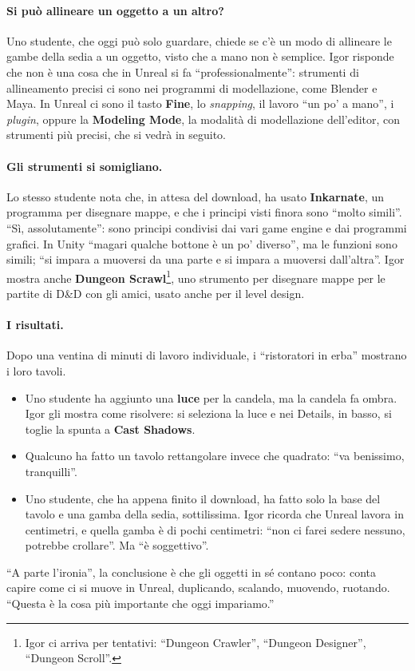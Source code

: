 \paragraph{Si può allineare un oggetto a un altro?} Uno studente, che oggi può solo
guardare, chiede se c'è un modo di allineare le gambe della sedia a un oggetto, visto
che a mano non è semplice. Igor risponde che non è una cosa che in Unreal si fa
``professionalmente'': strumenti di allineamento precisi ci sono nei programmi di
modellazione, come Blender e Maya. In Unreal ci sono il tasto \textbf{Fine}, lo
\emph{snapping}, il lavoro ``un po' a mano'', i \emph{plugin}, oppure la
\textbf{Modeling Mode}, la modalità di modellazione dell'editor, con strumenti più
precisi, che si vedrà in seguito.

\paragraph{Gli strumenti si somigliano.} Lo stesso studente nota che, in attesa del
download, ha usato \textbf{Inkarnate}, un programma per disegnare mappe, e che i
principi visti finora sono ``molto simili''. ``Sì, assolutamente'': sono principi
condivisi dai vari game engine e dai programmi grafici. In Unity ``magari qualche
bottone è un po' diverso'', ma le funzioni sono simili; ``si impara a muoversi da una
parte e si impara a muoversi dall'altra''. Igor mostra anche \textbf{Dungeon
Scrawl}\footnote{Igor ci arriva per tentativi: ``Dungeon Crawler'', ``Dungeon
Designer'', ``Dungeon Scroll''.}, uno strumento per disegnare mappe per le partite di
D\&D con gli amici, usato anche per il level design.

\paragraph{I risultati.} Dopo una ventina di minuti di lavoro individuale, i
``ristoratori in erba'' mostrano i loro tavoli.
\begin{itemize}
  \item Uno studente ha aggiunto una \textbf{luce} per la candela, ma la candela fa
        ombra. Igor gli mostra come risolvere: si seleziona la luce e nei Details, in
        basso, si toglie la spunta a \textbf{Cast Shadows}.
  \item Qualcuno ha fatto un tavolo rettangolare invece che quadrato: ``va benissimo,
        tranquilli''.
  \item Uno studente, che ha appena finito il download, ha fatto solo la base del tavolo
        e una gamba della sedia, sottilissima. Igor ricorda che Unreal lavora in
        centimetri, e quella gamba è di pochi centimetri: ``non ci farei sedere
        nessuno, potrebbe crollare''. Ma ``è soggettivo''.
\end{itemize}
``A parte l'ironia'', la conclusione è che gli oggetti in sé contano poco: conta capire
come ci si muove in Unreal, duplicando, scalando, muovendo, ruotando. ``Questa è la cosa
più importante che oggi impariamo.''

